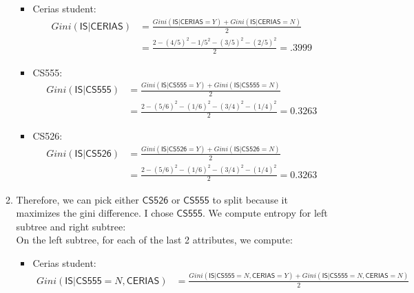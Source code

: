 \documentclass{article}
\begin{document}
\begin{enumerate}
\begin{enumerate}
\begin{itemize}
             \item Cerias student: 
             \begin{equation}
             \begin{split}
             Gini(\mathsf{IS} | \mathsf{CERIAS}) &= \frac{Gini(\mathsf{IS} | \mathsf{CERIAS} = Y) + Gini(\mathsf{IS} | \mathsf{CERIAS} = N)}{2}
                                                 \\&= \frac{2 - (4/5)^2 -1/5^2 - (3/5)^2-(2/5)^2}{2} = .3999
             \end{split}
             \end{equation}
             \item CS555:
             \begin{equation}
             \begin{split}
             Gini(\mathsf{IS} | \mathsf{CS555}) &= \frac{Gini(\mathsf{IS} | \mathsf{CS555} = Y) + Gini(\mathsf{IS} | \mathsf{CS555} = N)}{2}
             \\&= \frac{2 -(5/6)^2 - (1/6)^2 - (3/4)^2-(1/4)^2}{2} = 0.3263
             \end{split}
             \end{equation}
             \item CS526:
             \begin{equation}
             \begin{split}
             Gini(\mathsf{IS} | \mathsf{CS526}) &= \frac{Gini(\mathsf{IS} | \mathsf{CS526} = Y) + Gini(\mathsf{IS} | \mathsf{CS526} = N)}{2}
             \\&= \frac{2 -(5/6)^2 - (1/6)^2 - (3/4)^2-(1/4)^2}{2} = 0.3263
             \end{split}
             \end{equation}
         \end{itemize} 
        \item Therefore, we can pick either $\mathsf{CS526}$ or $\mathsf{CS555}$ to split because it maximizes the gini difference. I chose $\mathsf{CS555}$.
         We compute entropy for left subtree and right subtree:
         \\
         On the left subtree, for each of the last 2 attributes, we compute:
         \begin{itemize}
             \item Cerias student: 
             \begin{equation}
             \begin{split}
             Gini(\mathsf{IS} |\mathsf{CS555} = N, \mathsf{CERIAS}) &= \frac{Gini(\mathsf{IS} | \mathsf{CS555} = N,\mathsf{CERIAS} = Y) + Gini(\mathsf{IS} |\mathsf{CS555} = N, \mathsf{CERIAS} = N)}{2}

\end{split}
\end{equation}
\end{itemize}
\end{enumerate}
\end{enumerate}
\end{document}

